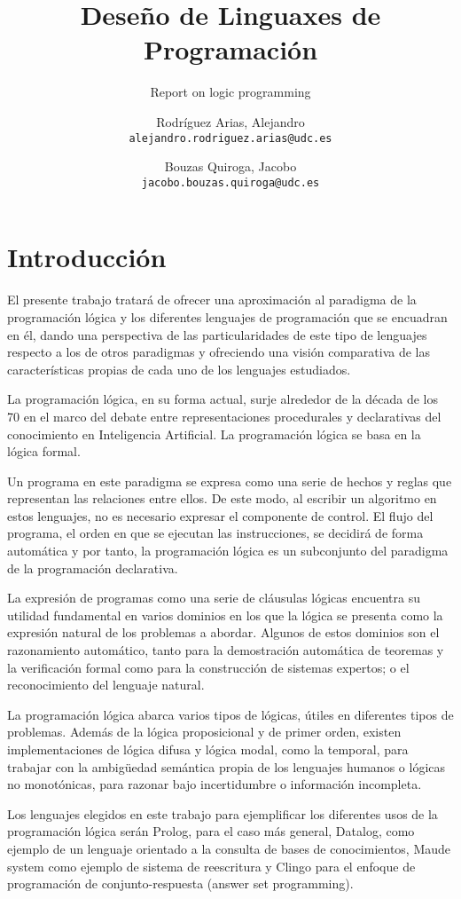 \documentclass[11pt,captions=nooneline,DIV=14, parskip=full]{scrartcl}
\title{Deseño de Linguaxes de Programación}
\subtitle{Report on logic programming}
\author{Rodríguez Arias, Alejandro\\
	\texttt{alejandro.rodriguez.arias@udc.es}
	\and Bouzas Quiroga, Jacobo\\
	\texttt{jacobo.bouzas.quiroga@udc.es}}
\date{\displaydate{release}}
\begin{document}
\maketitle
\clearpage
\tableofcontents
\clearpage

\section{Introducción}
\label{sec:intro}

El presente trabajo tratará de ofrecer una aproximación al paradigma de la programación lógica y los diferentes lenguajes de programación que se encuadran en él, dando una perspectiva de las particularidades de este tipo de lenguajes respecto a los de otros paradigmas y ofreciendo una visión comparativa de las características propias de cada uno de los lenguajes estudiados.

La programación lógica, en su forma actual, surje alrededor de la década de los 70 en el marco del debate entre representaciones procedurales y declarativas del conocimiento en Inteligencia Artificial. La programación lógica se basa en la lógica formal.

Un programa en este paradigma se expresa como una serie de hechos y reglas que representan las relaciones entre ellos. De este modo, al escribir un algoritmo en estos lenguajes, no es necesario expresar el componente de control. El flujo del programa, el orden en que se ejecutan las instrucciones, se decidirá de forma automática y por tanto, la programación lógica es un subconjunto del paradigma de la programación declarativa.

La expresión de programas como una serie de cláusulas lógicas encuentra su utilidad fundamental en varios dominios en los que la lógica se presenta como la expresión natural de los problemas a abordar. Algunos de estos dominios son el razonamiento automático, tanto para la demostración automática de teoremas y la verificación formal como para la construcción de sistemas expertos; o el reconocimiento del lenguaje natural.

La programación lógica abarca varios tipos de lógicas, útiles en diferentes tipos de problemas. Además de la lógica proposicional y de primer orden, existen implementaciones de lógica difusa y lógica modal, como la temporal, para trabajar con la ambigüedad semántica propia de los lenguajes humanos o lógicas no monotónicas, para razonar bajo incertidumbre o información incompleta.

Los lenguajes elegidos en este trabajo para ejemplificar los diferentes usos de la programación lógica serán Prolog, para el caso más general, Datalog, como ejemplo de un lenguaje orientado a la consulta de bases de conocimientos, Maude system como ejemplo de sistema de reescritura y Clingo para el enfoque de programación de conjunto-respuesta (answer set programming).
\end{document}
